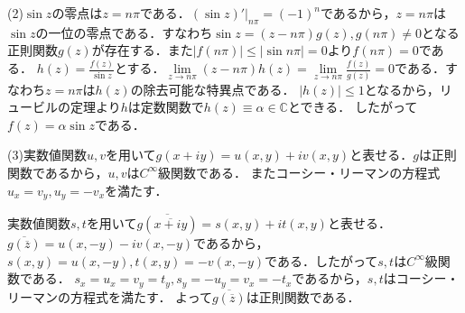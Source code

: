 \documentclass[
		book,
		head_space=20mm,
		foot_space=20mm,
		gutter=10mm,
		line_length=190mm
]{jlreq}
\begin{document}
(2)$\sin z$の零点は$z=n\pi$である．$(\sin z)'|_{n\pi}=(-1)^n$であるから，$z=n\pi$は$\sin z$の一位の零点である．すなわち$\sin z=(z-n\pi)g(z),g(n\pi)\neq 0$となる正則関数$g(z)$が存在する．また$|f(n\pi)|\le |\sin n\pi|=0$より$f(n\pi)=0$である．
$h(z)=\frac{f(z)}{\sin z}$とする．$\lim\limits_{z\to n\pi}(z-n\pi)h(z)=\lim\limits_{z\to n\pi}\frac{f(z)}{g(z)}=0$である．すなわち$z=n\pi$は$h(z)$の除去可能な特異点である．
$|h(z)|\le 1$となるから，リュービルの定理より$h$は定数関数で$h(z)\equiv \alpha \in \mathbb{C}$とできる．
したがって$f(z)=\alpha\sin z$である．

(3)実数値関数$u,v$を用いて$g(x+iy)=u(x,y)+iv(x,y)$と表せる．$g$は正則関数であるから，$u,v$は$C^\infty$級関数である．
またコーシー・リーマンの方程式$u_x = v_y,u_y=-v_x$を満たす．

実数値関数$s,t$を用いて$\overline{g(\overline{x+iy})}=s(x,y)+it(x,y)$と表せる．$\overline{g(\overline{z})}=u(x,-y)-iv(x,-y)$であるから，$s(x,y)=u(x,-y),t(x,y)=-v(x,-y)$である．したがって$s,t$は$C^\infty$級関数である．
$s_x=u_x=v_y=t_y,s_y=-u_y=v_x=-t_x$であるから，$s,t$はコーシー・リーマンの方程式を満たす．
よって$\overline{g(\overline{z})}$は正則関数である．
\end{document}
